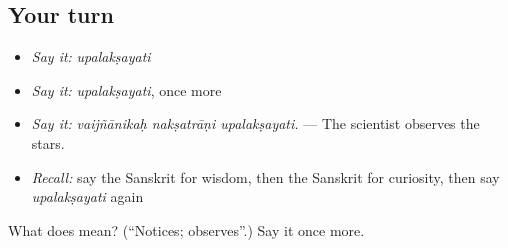 \subsection*{Your turn}
\begin{itemize}
\raggedright
  \item \emph{Say it:} \emph{upalakṣayati}
  \item \emph{Say it:} \emph{upalakṣayati}, once more
  \item \emph{Say it:} \emph{vaijñānikaḥ nakṣatrāṇi upalakṣayati.} — The scientist observes the stars.
  \item \emph{Recall:} say the Sanskrit for wisdom, then the Sanskrit for curiosity, then say \emph{upalakṣayati} again
\end{itemize}

\begin{tcolorbox}[breakable,colback=teal!4,colframe=teal!35!black,title={Before you move on}]
What does  mean? (\textquotedblleft{}Notices; observes\textquotedblright{}.) Say it once more.
\end{tcolorbox}
